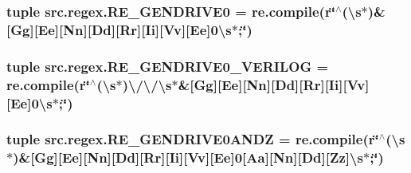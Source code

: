 \hypertarget{namespacesrc_1_1regex_a6c95073e5d870c11b3ea374f36cdcb9d}{
\subsubsection[{R\-E\-\_\-\-G\-E\-N\-D\-R\-I\-V\-E0}]{\setlength{\rightskip}{0pt plus 5cm}tuple src.\-regex.\-R\-E\-\_\-\-G\-E\-N\-D\-R\-I\-V\-E0 = re.\-compile(r\char`\"{}$^\wedge$(\textbackslash{}s$\ast$)\&\mbox{[}Gg\mbox{]}\mbox{[}Ee\mbox{]}\mbox{[}Nn\mbox{]}\mbox{[}Dd\mbox{]}\mbox{[}Rr\mbox{]}\mbox{[}Ii\mbox{]}\mbox{[}Vv\mbox{]}\mbox{[}Ee\mbox{]}0\textbackslash{}s$\ast$;\char`\"{})}}\label{namespacesrc_1_1regex_a6c95073e5d870c11b3ea374f36cdcb9d}
\hypertarget{namespacesrc_1_1regex_ac3b722b63dfebecb2f9e4d57808fafd6}{
\subsubsection[{R\-E\-\_\-\-G\-E\-N\-D\-R\-I\-V\-E0\-\_\-\-V\-E\-R\-I\-L\-O\-G}]{\setlength{\rightskip}{0pt plus 5cm}tuple src.\-regex.\-R\-E\-\_\-\-G\-E\-N\-D\-R\-I\-V\-E0\-\_\-\-V\-E\-R\-I\-L\-O\-G = re.\-compile(r\char`\"{}$^\wedge$(\textbackslash{}s$\ast$)\textbackslash{}/\textbackslash{}/\textbackslash{}s$\ast$\&\mbox{[}Gg\mbox{]}\mbox{[}Ee\mbox{]}\mbox{[}Nn\mbox{]}\mbox{[}Dd\mbox{]}\mbox{[}Rr\mbox{]}\mbox{[}Ii\mbox{]}\mbox{[}Vv\mbox{]}\mbox{[}Ee\mbox{]}0\textbackslash{}s$\ast$;\char`\"{})}}\label{namespacesrc_1_1regex_ac3b722b63dfebecb2f9e4d57808fafd6}
\hypertarget{namespacesrc_1_1regex_a73dc7ef54b508ab2d8952e6102d5f544}{
\subsubsection[{R\-E\-\_\-\-G\-E\-N\-D\-R\-I\-V\-E0\-A\-N\-D\-Z}]{\setlength{\rightskip}{0pt plus 5cm}tuple src.\-regex.\-R\-E\-\_\-\-G\-E\-N\-D\-R\-I\-V\-E0\-A\-N\-D\-Z = re.\-compile(r\char`\"{}$^\wedge$(\textbackslash{}s$\ast$)\&\mbox{[}Gg\mbox{]}\mbox{[}Ee\mbox{]}\mbox{[}Nn\mbox{]}\mbox{[}Dd\mbox{]}\mbox{[}Rr\mbox{]}\mbox{[}Ii\mbox{]}\mbox{[}Vv\mbox{]}\mbox{[}Ee\mbox{]}0\mbox{[}Aa\mbox{]}\mbox{[}Nn\mbox{]}\mbox{[}Dd\mbox{]}\mbox{[}Zz\mbox{]}\textbackslash{}s$\ast$;\char`\"{})}}\label{namespacesrc_1_1regex_a73dc7ef54b508ab2d8952e6102d5f544}
